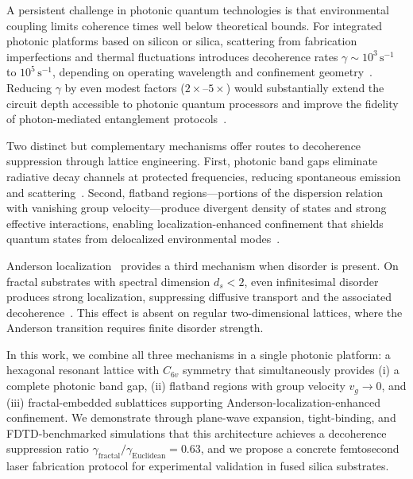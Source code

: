 \documentclass[10pt,letterpaper]{article}
\begin{document}
A persistent challenge in photonic quantum technologies is that environmental coupling limits coherence times well below theoretical bounds. For integrated photonic platforms based on silicon or silica, scattering from fabrication imperfections and thermal fluctuations introduces decoherence rates $\gamma \sim 10^3\,\mathrm{s}^{-1}$ to $10^5\,\mathrm{s}^{-1}$, depending on operating wavelength and confinement geometry~\cite{Johnson2000,Johnson1999}. Reducing $\gamma$ by even modest factors ($2\times$--$5\times$) would substantially extend the circuit depth accessible to photonic quantum processors and improve the fidelity of photon-mediated entanglement protocols~\cite{Kok2007,Peruzzo2010}.

Two distinct but complementary mechanisms offer routes to decoherence suppression through lattice engineering. First, photonic band gaps eliminate radiative decay channels at protected frequencies, reducing spontaneous emission and scattering~\cite{Yablonovitch1987,John1987}. Second, flatband regions---portions of the dispersion relation with vanishing group velocity---produce divergent density of states and strong effective interactions, enabling localization-enhanced confinement that shields quantum states from delocalized environmental modes~\cite{Lustig2019,Pertsch2002}.

Anderson localization~\cite{Wiersma1997} provides a third mechanism when disorder is present. On fractal substrates with spectral dimension $d_s < 2$, even infinitesimal disorder produces strong localization, suppressing diffusive transport and the associated decoherence~\cite{Alexander1982,Luo2003}. This effect is absent on regular two-dimensional lattices, where the Anderson transition requires finite disorder strength.

In this work, we combine all three mechanisms in a single photonic platform: a hexagonal resonant lattice with $C_{6v}$ symmetry that simultaneously provides (i) a complete photonic band gap, (ii) flatband regions with group velocity $v_g \to 0$, and (iii) fractal-embedded sublattices supporting Anderson-localization-enhanced confinement. We demonstrate through plane-wave expansion, tight-binding, and FDTD-benchmarked simulations that this architecture achieves a decoherence suppression ratio $\gamma_\mathrm{fractal}/\gamma_\mathrm{Euclidean} = 0.63$, and we propose a concrete femtosecond laser fabrication protocol for experimental validation in fused silica substrates.

\end{document}
